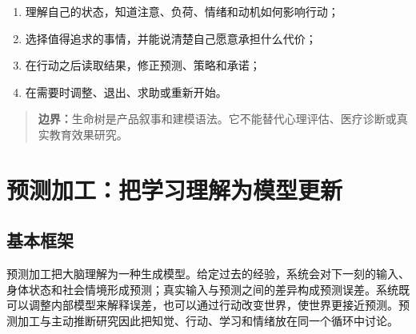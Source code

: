 \documentclass[UTF8,a4paper,11pt]{ctexart}
\newcommand{\boundary}[1]{\begin{quote}\noindent\textbf{\color{TenderPink}边界：}#1\end{quote}}
\begin{document}
\begin{enumerate}
\item 理解自己的状态，知道注意、负荷、情绪和动机如何影响行动；
\item 选择值得追求的事情，并能说清楚自己愿意承担什么代价；
\item 在行动之后读取结果，修正预测、策略和承诺；
\item 在需要时调整、退出、求助或重新开始。
\end{enumerate}

\boundary{生命树是产品叙事和建模语法。它不能替代心理评估、医疗诊断或真实教育效果研究。}

\newpage
\section{预测加工：把学习理解为模型更新}

\subsection{基本框架}

预测加工把大脑理解为一种生成模型。给定过去的经验，系统会对下一刻的输入、身体状态和社会情境形成预测；真实输入与预测之间的差异构成预测误差。系统既可以调整内部模型来解释误差，也可以通过行动改变世界，使世界更接近预测。预测加工与主动推断研究因此把知觉、行动、学习和情绪放在同一个循环中讨论\cite{Friston2010,Clark2013,PredictiveCodingReview2021}。
\end{document}
